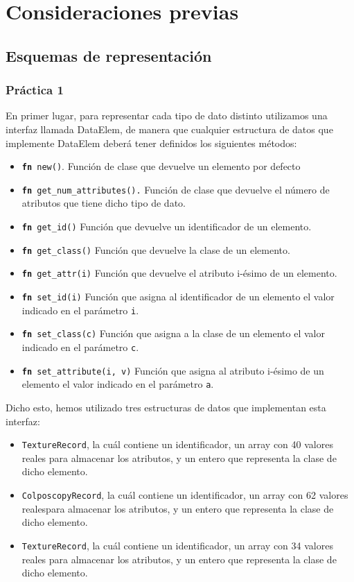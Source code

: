 \documentclass[size=a4, parskip=half, titlepage=false, toc=flat, toc=bib, 12pt]{scrartcl}
\begin{document}
\section{Consideraciones previas}
\subsection{Esquemas de representación}
\subsubsection{Práctica 1}
En primer lugar, para representar cada tipo de dato distinto utilizamos una interfaz llamada DataElem, de manera que cualquier estructura de datos que implemente DataElem deberá tener definidos los siguientes métodos:
\begin{itemize}
    \item \texttt{\textbf{fn} new()}. Función de clase que devuelve un elemento por defecto
    \item \texttt{\textbf{fn} get\_num\_attributes().} Función de clase que devuelve el número de atributos que tiene dicho tipo de dato.
    \item \texttt{\textbf{fn} get\_id()}  Función que devuelve un identificador de un elemento.
    \item \texttt{\textbf{fn} get\_class()} Función que devuelve la clase de un elemento.
    \item \texttt{\textbf{fn} get\_attr(i)} Función que devuelve el atributo i-ésimo de un elemento.
    \item \texttt{\textbf{fn} set\_id(i)} Función que asigna al identificador de un elemento el valor indicado en el parámetro \texttt{i}.
    \item \texttt{\textbf{fn} set\_class(c)} Función que asigna a la clase de un elemento el valor indicado en el parámetro \texttt{c}.
    \item \texttt{\textbf{fn} set\_attribute(i, v)} Función que asigna al atributo i-ésimo de un elemento el valor indicado en el parámetro \texttt{a}.
\end{itemize}

Dicho esto, hemos utilizado tres estructuras de datos que implementan esta interfaz:
\begin{itemize}
    \item \texttt{TextureRecord}, la cuál contiene un identificador, un array con 40 valores reales para almacenar los atributos, y un entero que representa la clase de dicho elemento.
    \item \texttt{ColposcopyRecord}, la cuál contiene un identificador, un array con 62 valores realespara almacenar los atributos, y un entero que representa la clase de dicho elemento.
    \item \texttt{TextureRecord}, la cuál contiene un identificador, un array con 34 valores reales para almacenar los atributos, y un entero que representa la clase de dicho elemento.
\end{itemize}
\end{document}
